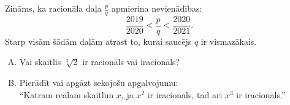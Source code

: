 \documentclass[a4paper,12pt]{article}
\begin{document}
\vspace{10pt}
\begin{problem}
Zināms, ka racionāla daļa $\frac{p}{q}$ apmierina nevienādības:
$$\frac{2019}{2020} < \frac{p}{q} < \frac{2020}{2021}.$$
Starp visām šādām daļām atrast to, kurai saucējs $q$ ir vismazākais.
\end{problem}


\vspace{10pt}
\begin{problem}
\begin{enumerate}[(A)]
\item Vai skaitlis $\sqrt[3]{2}$ ir racionāls vai iracionāls?
\item Pierādīt vai apgāzt sekojošu apgalvojumu:\\
``Katram reālam skaitlim $x$, ja $x^2$ ir iracionāls, tad arī $x^3$ ir iracionāls.''
\end{enumerate}
\end{problem}
\end{document}
